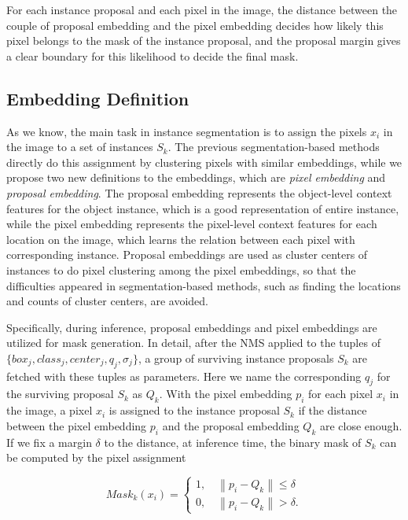 \documentclass[10pt,twocolumn,letterpaper]{article}
\begin{document}
For each instance proposal and each pixel in the image, the distance between the couple of proposal embedding and the pixel embedding decides how likely this pixel belongs to the mask of the instance proposal, and the proposal margin gives a clear boundary for this likelihood to decide the final mask.

\subsection{Embedding Definition} \label{sec:embed_def}

As we know, the main task in instance segmentation is to assign  the pixels $x_i$ in the image to a set of instances $S_k$. 
The previous segmentation-based methods directly do this assignment by clustering pixels with similar embeddings, while we propose two new definitions to the embeddings, which are \emph{pixel embedding} and \emph{proposal embedding}. 
The proposal embedding represents the object-level context features for the object instance, which is a good representation of entire instance, while the pixel embedding represents the pixel-level context features for each location on the image, which learns the relation between each pixel with corresponding instance.
Proposal embeddings are used as cluster centers of instances to do pixel clustering among the pixel embeddings, so that the difficulties appeared in segmentation-based methods, such as finding the locations and counts of cluster centers, are avoided. 

Specifically, during inference, proposal embeddings and pixel embeddings are utilized for mask generation. 
In detail, after the NMS applied to the tuples of $\{box_j, class_j, center_j, q_j, \sigma_j\}$, a group of surviving instance proposals $S_k$ are fetched with these tuples as parameters. 
Here we name the corresponding $q_j$ for the surviving proposal $S_k$ as $Q_k$.
With the pixel embedding $p_i$ for each pixel $x_i$ in the image, a pixel $x_i$ is assigned to the instance proposal $S_k$ if the distance between the pixel embedding $p_i$ and the proposal embedding $Q_k$ are close enough. 
If we fix a margin $\delta$ to the distance, at inference time, the binary mask of $S_k$ can be computed by the pixel assignment

\begin{equation}
   Mask_k(x_i)=\begin{cases}
   1,\quad \left\|p_i-Q_k\right\|\leq \delta \\
   0,\quad \left\|p_i-Q_k\right\|>\delta.
   \end{cases}
   \label{eq:mask}
\end{equation}
\end{document}
